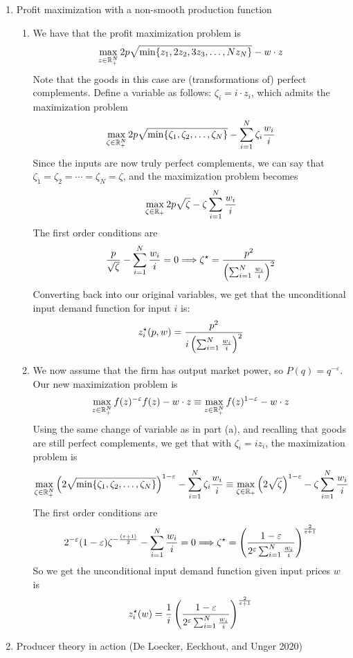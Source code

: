 \documentclass[12pt]{article}
\begin{document}
\begin{enumerate}
	\item Profit maximization with a non-smooth production function
	\begin{enumerate}
		\item We have that the profit maximization problem is
		\[
		\max_{z \in \mathbb{R}_+^N} 2p \sqrt{\min\{z_1,2z_2,3z_3,\dots,Nz_N\}} - w \cdot z
		\]
		Note that the goods in this case are (transformations of) perfect complements. Define a variable as follows: $\zeta_i = i \cdot z_i$, which admits the maximization problem
		\[
		\max_{\zeta \in \mathbb{R}_+^N} 2p \sqrt{\min\{\zeta_1,\zeta_2,\dots,\zeta_N\}} - \sum_{i=1}^N \zeta_i \frac{w_i}{i}
		\] 
		Since the inputs are now truly perfect complements, we can say that $\zeta_1 = \zeta_2 = \cdots = \zeta_N = \zeta$, and the maximization problem becomes
		\[
		\max_{\zeta\in \mathbb{R}_+} 2p \sqrt{\zeta} - \zeta \sum_{i=1}^N \frac{w_i}{i}
		\]
		The first order conditions are
		\[
		\frac{p}{\sqrt{\zeta}} - \sum_{i=1}^N \frac{w_i}{i} = 0 \Longrightarrow \zeta^\star = \frac{p^2}{\left( \sum_{i=1}^N \frac{w_i}{i}\right)^2}
		\]
		Converting back into our original variables, we get that the unconditional input demand function for input $i$ is:
		\[
		z_i^\star(p,w) = \frac{p^2}{i\left( \sum_{i=1}^N \frac{w_i}{i}\right)^2}
		\]
		\item We now assume that the firm has output market power, so $P(q) = q^{-\varepsilon}$. Our new maximization problem is
		\[
		\max_{z \in \mathbb{R}^N_+} f(z)^{-\varepsilon} f(z) - w \cdot z \equiv \max_{z \in \mathbb{R}^N_+} f(z)^{1 - \varepsilon}- w \cdot z
		\]
		Using the same change of variable as in part (a), and recalling that goods are still perfect complements, we get that with $\zeta_i = i z_i$, the maximization problem is
		\[
		\max_{\zeta \in \mathbb{R}_+^N} \left( 2 \sqrt{\min\{\zeta_1,\zeta_2,\dots,\zeta_N\}}\right)^{1-\varepsilon} - \sum_{i=1}^N \zeta_i \frac{w_i}{i} \equiv \max_{\zeta\in \mathbb{R}_+} \left(2 \sqrt{\zeta}\right)^{1-\varepsilon} - \zeta \sum_{i=1}^N \frac{w_i}{i}
		\]
		The first order conditions are
		\[
		2^{-\varepsilon} (1 - \varepsilon) \zeta^{-\frac{(\varepsilon + 1)}{2}} - \sum_{i=1}^N \frac{w_i}{i} = 0 \Longrightarrow \zeta^\star = \left( \frac{1 - \varepsilon}{2^\varepsilon \sum_{i=1}^N \frac{w_i}{i}} \right)^\frac{2}{\varepsilon + 1}
		\]
		So we get the unconditional input demand function given input prices $w$ is
		\[
		z_i^\star (w) = \frac{1}{i} \left( \frac{1 - \varepsilon}{2^\varepsilon \sum_{i=1}^N \frac{w_i}{i}} \right)^\frac{2}{\varepsilon + 1}
		\]
	\end{enumerate}
	\item Producer theory in action (De Loecker, Eeckhout, and Unger 2020)

\end{enumerate}
\end{document}
